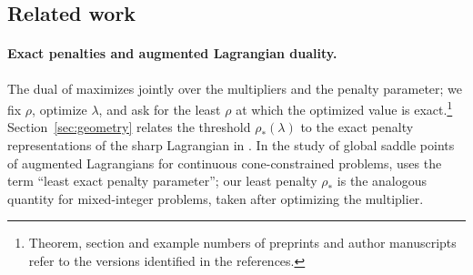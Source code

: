 \subsection{Related work}\label{sec:related}
\paragraph{Exact penalties and augmented Lagrangian duality.}
The dual of \citet{Rockafellar1974} maximizes jointly over the
multipliers and the penalty parameter; we fix $\rho$, optimize
$\lambda$, and ask for the least $\rho$ at which the optimized value is
exact.\footnote{Theorem, section and example numbers of preprints and
author manuscripts refer to the versions identified in the references.}
Section~\ref{sec:geometry} relates the threshold $\rho_*(\lambda)$ to
the exact penalty representations of the sharp Lagrangian in
\citet[Chapter~11]{RockafellarWets1998}. In the study of global
saddle points of augmented Lagrangians for continuous cone-constrained
problems, \citet{Dolgopolik2018} uses the term ``least exact penalty
parameter''; our least penalty $\rho_*$ is the analogous quantity for
mixed-integer problems, taken after optimizing the multiplier.

